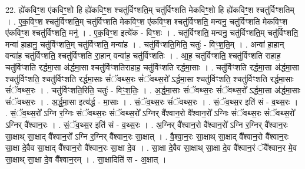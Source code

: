 \documentclass[17pt]{extarticle}
\begin{document}
22. ह्ये॑कविꣳ॒॒श ए॑कविꣳ॒॒शो हि ह्ये॑कविꣳ॒॒श श्चतु॑र्विꣳशति॒म् चतु॑र्विꣳशति मेकविꣳ॒॒शो हि ह्ये॑कविꣳ॒॒श श्चतु॑र्विꣳशतिम् । . ए॒क॒विꣳ॒॒श श्चतु॑र्विꣳशति॒म् चतु॑र्विꣳशति मेकविꣳ॒॒श ए॑कविꣳ॒॒श श्चतु॑र्विꣳशति॒ मन्वनु॒ चतु॑र्विꣳशति मेकविꣳ॒॒श ए॑कविꣳ॒॒श श्चतु॑र्विꣳशति॒ मनु॑ । . ए॒क॒विꣳ॒॒श इत्ये॑क - विꣳ॒॒शः । . चतु॑र्विꣳशति॒ मन्वनु॒ चतु॑र्विꣳशति॒म् चतु॑र्विꣳशति॒ मन्वा॑ हा॒हानु॒ चतु॑र्विꣳशति॒म् चतु॑र्विꣳशति॒ मन्वा॑ह । . चतु॑र्विꣳशति॒मिति॒ चतुः॑ - विꣳ॒॒श॒ति॒म् । . अन्वा॑ हा॒हान् वन्वा॑ह॒ चतु॑र्विꣳशति॒ श्चतु॑र्विꣳशति रा॒हान् वन्वा॑ह॒ चतु॑र्विꣳशतिः । . आ॒ह॒ चतु॑र्विꣳशति॒ श्चतु॑र्विꣳशति राहाह॒ चतु॑र्विꣳशति रर्द्धमा॒सा अ॑र्द्धमा॒सा श्चतु॑र्विꣳशतिराहाह॒ चतु॑र्विꣳशति रर्द्धमा॒साः । . चतु॑र्विꣳशति रर्द्धमा॒सा अ॑र्द्धमा॒सा श्चतु॑र्विꣳशति॒ श्चतु॑र्विꣳशति रर्द्धमा॒साः सं॑ॅवथ्स॒रः सं॑ॅवथ्स॒रो᳚ ऽर्द्धमा॒सा श्चतु॑र्विꣳशति॒ श्चतु॑र्विꣳशति रर्द्धमा॒साः सं॑ॅवथ्स॒रः । . चतु॑र्विꣳशति॒रिति॒ चतुः॑ - विꣳ॒॒श॒तिः॒ । . अ॒र्द्ध॒मा॒साः सं॑ॅवथ्स॒रः सं॑ॅवथ्स॒रो᳚ ऽर्द्धमा॒सा अ॑र्द्धमा॒साः सं॑ॅवथ्स॒रः । . अ॒र्द्ध॒मा॒सा इत्य॑र्द्ध - मा॒साः । . सं॒ॅव॒थ्स॒रः सं॑ॅवथ्स॒रः । . सं॒ॅव॒थ्स॒र इति॑ सं - व॒थ्स॒रः । . सं॒ॅव॒थ्स॒रो᳚ ऽग्नि र॒ग्निः सं॑ॅवथ्स॒रः सं॑ॅवथ्स॒रो᳚ ऽग्निर् वै᳚श्वान॒रो वै᳚श्वान॒रो᳚ ऽग्निः सं॑ॅवथ्स॒रः सं॑ॅवथ्स॒रो᳚ ऽग्निर् वै᳚श्वान॒रः । . सं॒ॅव॒थ्स॒र इति॑ सं - व॒थ्स॒रः । . अ॒ग्निर् वै᳚श्वान॒रो वै᳚श्वान॒रो᳚ ऽग्नि र॒ग्निर् वै᳚श्वान॒रः सा॒क्षाथ् सा॒क्षाद् वै᳚श्वान॒रो᳚ ऽग्नि र॒ग्निर् वै᳚श्वान॒रः सा॒क्षात् । . वै॒श्वा॒न॒रः सा॒क्षाथ् सा॒क्षाद् वै᳚श्वान॒रो वै᳚श्वान॒रः सा॒क्षा दे॒वैव सा॒क्षाद् वै᳚श्वान॒रो वै᳚श्वान॒रः सा॒क्षा दे॒व । . सा॒क्षा दे॒वैव सा॒क्षाथ् सा॒क्षा दे॒व वै᳚श्वान॒रं ॅवै᳚श्वान॒र मे॒व सा॒क्षाथ् सा॒क्षा दे॒व वै᳚श्वान॒रम् । . सा॒क्षादिति॑ स - अ॒क्षात् । \newline
\end{document}
